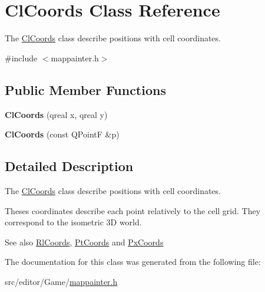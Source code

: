 \hypertarget{class_cl_coords}{\section{\-Cl\-Coords \-Class \-Reference}
\label{class_cl_coords}
}


\-The \hyperlink{class_cl_coords}{\-Cl\-Coords} class describe positions with cell coordinates.  




{\ttfamily \#include $<$mappainter.\-h$>$}

\subsection*{\-Public \-Member \-Functions}
\begin{DoxyCompactItemize}
\item 
\hypertarget{class_cl_coords_a45685abe9c81595e2926edc414b425e7}{{\bfseries \-Cl\-Coords} (qreal x, qreal y)}\label{class_cl_coords_a45685abe9c81595e2926edc414b425e7}

\item 
\hypertarget{class_cl_coords_a48c6c4a46561da6e0a14ca6f3483426a}{{\bfseries \-Cl\-Coords} (const \-Q\-Point\-F \&p)}\label{class_cl_coords_a48c6c4a46561da6e0a14ca6f3483426a}

\end{DoxyCompactItemize}


\subsection{\-Detailed \-Description}
\-The \hyperlink{class_cl_coords}{\-Cl\-Coords} class describe positions with cell coordinates. 

\-Theses coordinates describe each point relatively to the cell grid. \-They correspond to the isometric 3\-D world.

\-See also \hyperlink{class_rl_coords}{\-Rl\-Coords}, \hyperlink{class_pt_coords}{\-Pt\-Coords} and \hyperlink{class_px_coords}{\-Px\-Coords} 

\-The documentation for this class was generated from the following file\-:\begin{DoxyCompactItemize}
\item 
src/editor/\-Game/\hyperlink{mappainter_8h}{mappainter.\-h}\end{DoxyCompactItemize}
